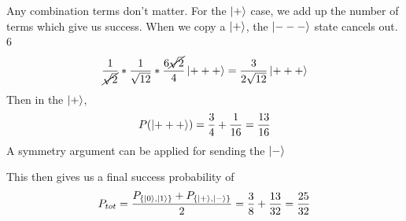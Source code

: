 \documentclass[]{article}
\begin{document}
Any combination terms don't matter. For the \(\ket{+}\) case, we add up
the number of terms which give us success. When we copy a \(\ket{+}\),
the \(\ket{---}\) state cancels out. 6 \[
\frac{1}{\cancel{ \sqrt{ 2 } }}* \frac{1}{\sqrt{ 12 }}* \frac{6\cancel{ \sqrt{ 2 } }}{4}\ket{+++}  = \frac{3}{2\sqrt{ 12 }}\ket{+++} 
\] Then in the \(\ket{+}\), \[
P(\ket{+++} ) = \frac{3}{4}+\frac{1}{16}=\frac{13}{16}
\] A symmetry argument can be applied for sending the \(\ket{-}\)

This then gives us a final success probability of \[
P_{tot} = \frac{{P_{\left\{ \ket{0} ,\ket{1}  \right\}  }+P_{\left\{ \ket{+} ,\ket{-}  \right\}  }}}{ 2} = \frac{3}{8}+\frac{13}{32} = \frac{25}{32}
\]
\end{document}
